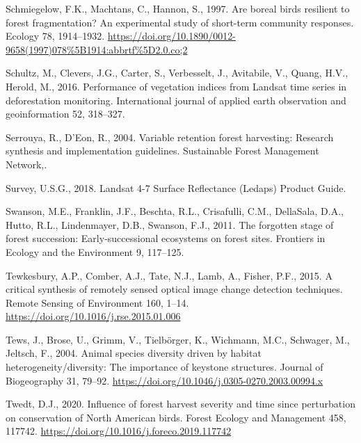 \documentclass[
  12pt,
]{article}
\newlength{\cslhangindent}
\newlength{\cslentryspacingunit} %
\newenvironment{CSLReferences}[2] %
 {%
  \setlength{\parindent}{0pt}
  \ifodd #1
  \let\oldpar\par
  \def\par{\hangindent=\cslhangindent\oldpar}
  \fi
  \setlength{\parskip}{#2\cslentryspacingunit}
 }%
 {}
\begin{document}
\begin{CSLReferences}{1}{0}
\leavevmode{}%
Schmiegelow, F.K., Machtans, C., Hannon, S., 1997. Are boreal birds resilient to forest fragmentation? {An} experimental study of short-term community responses. Ecology 78, 1914--1932. \url{https://doi.org/10.1890/0012-9658(1997)078\%5B1914:abbrtf\%5D2.0.co;2}

\leavevmode{}%
Schultz, M., Clevers, J.G., Carter, S., Verbesselt, J., Avitabile, V., Quang, H.V., Herold, M., 2016. Performance of vegetation indices from {Landsat} time series in deforestation monitoring. International journal of applied earth observation and geoinformation 52, 318--327.

\leavevmode{}%
Serrouya, R., D'Eon, R., 2004. Variable retention forest harvesting: Research synthesis and implementation guidelines. Sustainable Forest Management Network,.

\leavevmode{}%
Survey, U.S.G., 2018. Landsat 4-7 {Surface} {Reflectance} ({Ledaps}) {Product} {Guide}.

\leavevmode{}%
Swanson, M.E., Franklin, J.F., Beschta, R.L., Crisafulli, C.M., DellaSala, D.A., Hutto, R.L., Lindenmayer, D.B., Swanson, F.J., 2011. The forgotten stage of forest succession: Early-successional ecosystems on forest sites. Frontiers in Ecology and the Environment 9, 117--125.

\leavevmode{}%
Tewkesbury, A.P., Comber, A.J., Tate, N.J., Lamb, A., Fisher, P.F., 2015. A critical synthesis of remotely sensed optical image change detection techniques. Remote Sensing of Environment 160, 1--14. \url{https://doi.org/10.1016/j.rse.2015.01.006}

\leavevmode{}%
Tews, J., Brose, U., Grimm, V., Tielbörger, K., Wichmann, M.C., Schwager, M., Jeltsch, F., 2004. Animal species diversity driven by habitat heterogeneity/diversity: The importance of keystone structures. Journal of Biogeography 31, 79--92. \url{https://doi.org/10.1046/j.0305-0270.2003.00994.x}

\leavevmode{}%
Twedt, D.J., 2020. Influence of forest harvest severity and time since perturbation on conservation of {North} {American} birds. Forest Ecology and Management 458, 117742. \url{https://doi.org/10.1016/j.foreco.2019.117742}


\end{CSLReferences}
\end{document}
